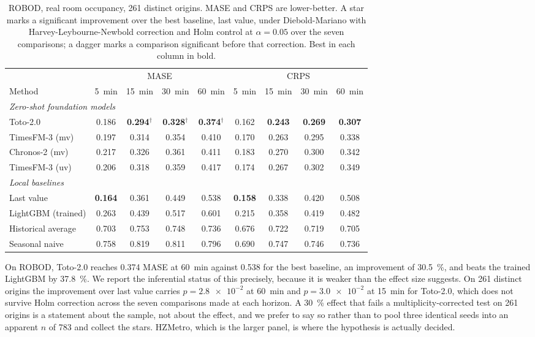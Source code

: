 \documentclass[utf8]{FrontiersinHarvard}
\theoremstyle{plain}
\theoremstyle{definition}
\theoremstyle{remark}
\newcommand{\best}[1]{\textbf{#1}}
\begin{document}
\begin{table}[htbp]
\centering
\caption{ROBOD, real room occupancy, \num{261} distinct origins. MASE and CRPS are lower-better. A star marks a significant improvement over the best baseline, last value, under Diebold-Mariano with Harvey-Leybourne-Newbold correction and Holm control at $\alpha=0.05$ over the seven comparisons; a dagger marks a comparison significant before that correction. Best in each column in bold.}
\label{tab:robod}
\small
\begin{tabular}{lcccccccc}
\toprule
& \multicolumn{4}{c}{MASE} & \multicolumn{4}{c}{CRPS} \\
\cmidrule(lr){2-5}\cmidrule(lr){6-9}
Method & \SI{5}{\minute} & \SI{15}{\minute} & \SI{30}{\minute} & \SI{60}{\minute} & \SI{5}{\minute} & \SI{15}{\minute} & \SI{30}{\minute} & \SI{60}{\minute} \\
\midrule
\multicolumn{9}{l}{\emph{Zero-shot foundation models}}\\
Toto-2.0                & 0.186 & \best{0.294}$^{\dagger}$ & \best{0.328}$^{\dagger}$ & \best{0.374}$^{\dagger}$ & 0.162 & \best{0.243} & \best{0.269} & \best{0.307} \\
TimesFM-3 (mv)          & 0.197 & 0.314 & 0.354 & 0.410 & 0.170 & 0.263 & 0.295 & 0.338 \\
Chronos-2 (mv)          & 0.217 & 0.326 & 0.361 & 0.411 & 0.183 & 0.270 & 0.300 & 0.342 \\
TimesFM-3 (uv)          & 0.206 & 0.318 & 0.359 & 0.417 & 0.174 & 0.267 & 0.302 & 0.349 \\
\midrule
\multicolumn{9}{l}{\emph{Local baselines}}\\
Last value              & \best{0.164} & 0.361 & 0.449 & 0.538 & \best{0.158} & 0.338 & 0.420 & 0.508 \\
LightGBM (trained)      & 0.263 & 0.439 & 0.517 & 0.601 & 0.215 & 0.358 & 0.419 & 0.482 \\
Historical average      & 0.703 & 0.753 & 0.748 & 0.736 & 0.676 & 0.722 & 0.719 & 0.705 \\
Seasonal naive          & 0.758 & 0.819 & 0.811 & 0.796 & 0.690 & 0.747 & 0.746 & 0.736 \\
\bottomrule
\end{tabular}
\end{table}

On ROBOD, Toto-2.0 reaches \num{0.374} MASE at \SI{60}{\minute} against \num{0.538} for the best baseline, an improvement of \SI{30.5}{\percent}, and beats the trained LightGBM by \SI{37.8}{\percent}. We report the inferential status of this precisely, because it is weaker than the effect size suggests. On \num{261} distinct origins the improvement over last value carries $p=\num{2.8e-2}$ at \SI{60}{\minute} and $p=\num{3.0e-2}$ at \SI{15}{\minute} for Toto-2.0, which does not survive Holm correction across the seven comparisons made at each horizon. A \SI{30}{\percent} effect that fails a multiplicity-corrected test on \num{261} origins is a statement about the sample, not about the effect, and we prefer to say so rather than to pool three identical seeds into an apparent $n$ of \num{783} and collect the stars. HZMetro, which is the larger panel, is where the hypothesis is actually decided.
\end{document}
